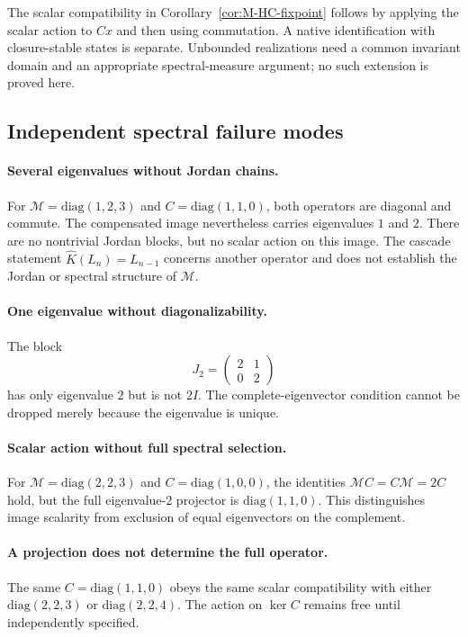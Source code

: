 The scalar compatibility in Corollary~\ref{cor:M-HC-fixpoint}
follows by applying the scalar action to $Cx$ and then using
commutation. A native identification with closure-stable states is
separate. Unbounded realizations need a common invariant domain and
an appropriate spectral-measure argument; no such extension is proved here.

\subsection{Independent spectral failure modes}
\label{app:hc-spectral-counterexamples}

\paragraph{Several eigenvalues without Jordan chains.}
For $\mathcal M=\mathrm{diag}(1,2,3)$ and
$C=\mathrm{diag}(1,1,0)$, both operators are diagonal and commute.
The compensated image nevertheless carries eigenvalues $1$ and $2$.
There are no nontrivial Jordan blocks, but no scalar action on this image.
The cascade statement $\hat K(L_n)=L_{n-1}$ concerns another operator
and does not establish the Jordan or spectral structure of $\mathcal M$.

\paragraph{One eigenvalue without diagonalizability.}
The block
\[
 J_2=\begin{pmatrix}2&1\\0&2\end{pmatrix}
\]
has only eigenvalue $2$ but is not $2I$. The complete-eigenvector
condition cannot be dropped merely because the eigenvalue is unique.

\paragraph{Scalar action without full spectral selection.}
For $\mathcal M=\mathrm{diag}(2,2,3)$ and
$C=\mathrm{diag}(1,0,0)$, the identities
$\mathcal MC=C\mathcal M=2C$ hold, but the full eigenvalue-$2$
projector is $\mathrm{diag}(1,1,0)$. This distinguishes image
scalarity from exclusion of equal eigenvectors on the complement.

\paragraph{A projection does not determine the full operator.}
The same $C=\mathrm{diag}(1,1,0)$ obeys the same scalar compatibility
with either $\mathrm{diag}(2,2,3)$ or $\mathrm{diag}(2,2,4)$.
The action on $\ker C$ remains free until independently specified.

